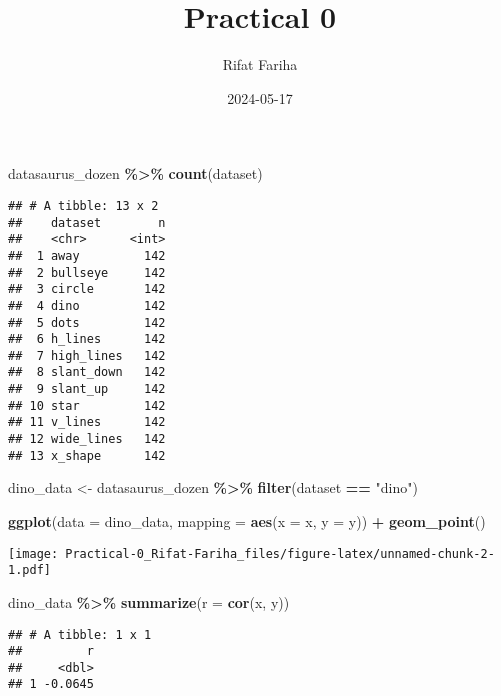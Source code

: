 \documentclass[
]{article}
\title{Practical 0}
\author{Rifat Fariha}
\date{2024-05-17}
\newenvironment{Shaded}{\begin{snugshade}}{\end{snugshade}}
\newcommand{\AttributeTok}[1]{\textcolor[rgb]{0.13,0.29,0.53}{#1}}
\newcommand{\FunctionTok}[1]{\textcolor[rgb]{0.13,0.29,0.53}{\textbf{#1}}}
\newcommand{\NormalTok}[1]{#1}
\newcommand{\OtherTok}[1]{\textcolor[rgb]{0.56,0.35,0.01}{#1}}
\newcommand{\SpecialCharTok}[1]{\textcolor[rgb]{0.81,0.36,0.00}{\textbf{#1}}}
\newcommand{\StringTok}[1]{\textcolor[rgb]{0.31,0.60,0.02}{#1}}
\begin{document}
\maketitle

\begin{Shaded}
\begin{Highlighting}[]
\NormalTok{datasaurus\_dozen }\SpecialCharTok{\%\textgreater{}\%}
  \FunctionTok{count}\NormalTok{(dataset)}
\end{Highlighting}
\end{Shaded}

\begin{verbatim}
## # A tibble: 13 x 2
##    dataset        n
##    <chr>      <int>
##  1 away         142
##  2 bullseye     142
##  3 circle       142
##  4 dino         142
##  5 dots         142
##  6 h_lines      142
##  7 high_lines   142
##  8 slant_down   142
##  9 slant_up     142
## 10 star         142
## 11 v_lines      142
## 12 wide_lines   142
## 13 x_shape      142
\end{verbatim}

\begin{Shaded}
\begin{Highlighting}[]
\NormalTok{dino\_data }\OtherTok{\textless{}{-}}\NormalTok{ datasaurus\_dozen }\SpecialCharTok{\%\textgreater{}\%}
  \FunctionTok{filter}\NormalTok{(dataset }\SpecialCharTok{==} \StringTok{"dino"}\NormalTok{)}

\FunctionTok{ggplot}\NormalTok{(}\AttributeTok{data =}\NormalTok{ dino\_data, }\AttributeTok{mapping =} \FunctionTok{aes}\NormalTok{(}\AttributeTok{x =}\NormalTok{ x, }\AttributeTok{y =}\NormalTok{ y)) }\SpecialCharTok{+}
  \FunctionTok{geom\_point}\NormalTok{()}
\end{Highlighting}
\end{Shaded}

\texttt{[image: Practical-0\_Rifat-Fariha\_files/figure-latex/unnamed-chunk-2-1.pdf]}

\begin{Shaded}
\begin{Highlighting}[]
\NormalTok{dino\_data }\SpecialCharTok{\%\textgreater{}\%}
  \FunctionTok{summarize}\NormalTok{(}\AttributeTok{r =} \FunctionTok{cor}\NormalTok{(x, y))}
\end{Highlighting}
\end{Shaded}

\begin{verbatim}
## # A tibble: 1 x 1
##         r
##     <dbl>
## 1 -0.0645
\end{verbatim}
\end{document}
